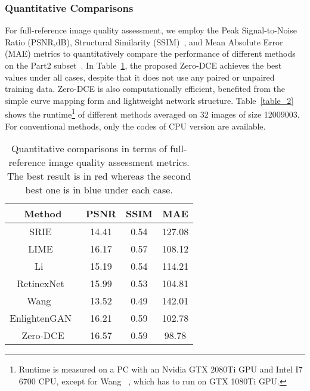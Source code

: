 \documentclass[10pt,twocolumn,letterpaper]{article}
\begin{document}
\vspace{-12pt}
\subsubsection{Quantitative Comparisons}

For full-reference image quality assessment, we employ the Peak Signal-to-Noise Ratio (PSNR,dB), Structural Similarity (SSIM)~\cite{SSIM}, and Mean Absolute Error (MAE) metrics to quantitatively compare the performance of different methods on the Part2 subset~\cite{Cai2018}.  In Table~\ref{table_1}, the proposed Zero-DCE achieves the best values under all cases, despite that it does not use any paired or unpaired training data.
Zero-DCE is also computationally efficient, benefited from the simple curve mapping form and lightweight network structure.  Table~\ref{table_2} shows the runtime\footnote[4]{Runtime is measured on a PC with an Nvidia GTX 2080Ti GPU and Intel I7 6700 CPU, except for Wang \etal~\cite{Wang2019}, which has to run on GTX 1080Ti GPU.} of different methods averaged on 32 images of size 12009003. For conventional methods, only the codes of CPU version are available.

\begin{table}[t]
\caption{Quantitative comparisons in terms of full-reference image quality assessment metrics. The best result is in red whereas the second best one is in blue under each case.}
	\vspace{-0.2cm}
	\centering
	\begin{tabular}{c|c|c|c}
		\hline
		\textbf{Method} & \textbf{PSNR } & \textbf{SSIM}  & \textbf{MAE} \\
		\hline
		SRIE~\cite{Fu2016}           &  14.41      & 0.54 & 127.08\\
		LIME~\cite{Guo2017}          &  16.17      & {\color{blue}0.57} & 108.12\\
		Li \etal~\cite{Li2018}          &  15.19      &   0.54 &114.21         \\
		RetinexNet~\cite{Chen2018}   &  15.99      & 0.53 & 104.81 \\
		Wang \etal~\cite{Wang2019}      &  13.52      &0.49  & 142.01\\
		EnlightenGAN~\cite{Jiang2019}&  {\color{blue}16.21}    & {\color{red}0.59} & {\color{blue}102.78}\\
		Zero-DCE                      &  {\color{red}16.57}     & {\color{red}0.59} & {\color{red}98.78}\\
		\hline
	\end{tabular}
	\vspace{-5pt}
	\label{table_1}
\end{table}
\end{document}
